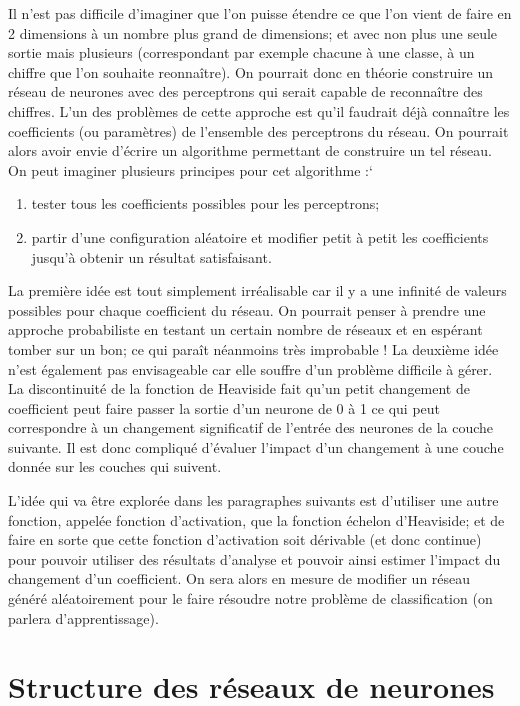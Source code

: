 Il n'est pas difficile d'imaginer que l'on puisse étendre ce que l'on vient de faire en 
2 dimensions à un nombre plus grand de dimensions; et avec non plus une seule sortie 
mais plusieurs (correspondant par exemple chacune à une classe, à un chiffre que l'on 
souhaite reonnaître).
On pourrait donc en théorie construire un réseau de neurones avec des perceptrons 
qui serait capable de reconnaître des chiffres. 
L'un des problèmes de cette approche est qu'il faudrait déjà connaître les coefficients 
(ou paramètres) de l'ensemble des perceptrons du réseau.
On pourrait alors avoir envie d'écrire un algorithme permettant de construire un tel 
réseau. On peut imaginer plusieurs principes pour cet algorithme :`
\begin{enumerate}
  \item tester tous les coefficients possibles pour les perceptrons;
  \item partir d'une configuration aléatoire et modifier petit à petit les coefficients 
        jusqu'à obtenir un résultat satisfaisant.
\end{enumerate}

La première idée est tout simplement irréalisable car il y a une infinité de valeurs 
possibles pour chaque coefficient du réseau. On pourrait penser à prendre une 
approche probabiliste en testant un certain nombre de réseaux et en espérant tomber sur 
un bon; ce qui paraît néanmoins très improbable ! 
La deuxième idée n'est également pas envisageable car elle souffre d'un problème difficile 
à gérer. La discontinuité de la fonction de Heaviside fait qu'un petit changement de coefficient 
peut faire passer la sortie d'un neurone de 0 à 1 ce qui peut correspondre à un changement 
significatif de l'entrée des neurones de la couche suivante. Il est donc compliqué d'évaluer 
l'impact d'un changement à une couche donnée sur les couches qui suivent.

L'idée qui va être explorée dans les paragraphes suivants est d'utiliser une autre fonction, 
appelée fonction d'activation, que la fonction échelon d'Heaviside; et de faire en sorte que 
cette fonction d'activation soit dérivable (et donc continue) pour pouvoir utiliser des 
résultats d'analyse et pouvoir ainsi estimer l'impact du changement d'un coefficient.
On sera alors en mesure de modifier un réseau généré aléatoirement pour le faire résoudre 
notre problème de classification (on parlera d'apprentissage).



\section{Structure des réseaux de neurones}



